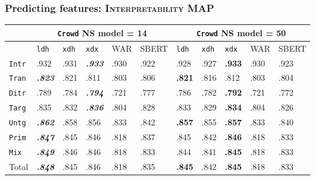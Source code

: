\documentclass[xcolor={dvipsnames}]{beamer}
\newcommand{\feat}[1]{\textsc{#1}}
\newcommand{\param}[1]{\texttt{#1}}
\begin{document}
\begin{frame}
\frametitle{Predicting features: \feat{Interpretability} MAP}

\small

\begin{table}[htb!]
\begin{center}
\setlength{\tabcolsep}{.35em}
\begin{tabular}{|l||l|l|l||l|l||l|l|l||l|l|}
\hline
 & \multicolumn{5}{c||}{\param{Crowd} NS model = 14} & \multicolumn{5}{c|}{\param{Crowd} NS model = 50} \\
\hline
    		& \param{ldh}	& \param{xdh} &	\param{xdx} & WAR	& {\scriptsize SBERT} & \param{ldh}	& \param{xdh} &	\param{xdx} & WAR	& {\scriptsize SBERT} \\ \hline
\hline
\param{Intr}  & .932                   & .931 & \textit{\textbf{.933}} & .930 & .922 & .928          & .927 & \textbf{.933} & .930 & .923 \\
\hline
\param{Tran}  & \textit{\textbf{.823}} & .821 & .811                   & .803 & .806 & \textbf{.821} & .816 & .812                   & .803 & .804 \\
\hline
\param{Ditr}  & .789                   & .784 & \textit{\textbf{.794}} & .721 & .777 & .786          & .782 & 
\textbf{.792}          & .721 & .772 \\
\hline
\hline
\param{Targ}  & .835                   & .832 & \textit{\textbf{.836}} & .804 & .828 & .833          & .829 & \textbf{.834}          & .804 & .826 \\
\hline
\param{Untg}  & \textit{\textbf{.862}} & .858 & .856                   & .833 & .842 & \textbf{.857} & .855 & \textbf{.857}          & .833 & .840 \\
\hline
\hline
\param{Prim}  & \textit{\textbf{.847}} & .845 & .846                   & .818 & .837 & .845          & .842 & \textbf{.846}          & .818 & .833 \\
\hline
\param{Mix}   & \textit{\textbf{.849}} & .846 & .846                   & .818 & .833 & .844          & .841 & \textbf{.845}          & .818 & .833 \\
\hline
\hline
Total & \textit{\textbf{.848}} & .845 & .846                   & .818 & .835 & \textbf{.845} & .842 & \textbf{.845}          & .818 & .833 \\
\hline
\end{tabular}
\end{center}
\end{table}



\end{frame}
\end{document}
